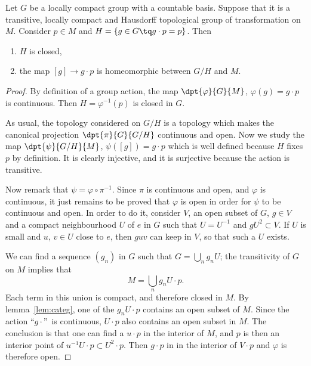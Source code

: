 \begin{theorem} \label{tho:homeo_action}
Let $G$ be a locally compact group with a countable basis. Suppose that it is a transitive, locally compact and Hausdorff topological group of transformation on $M$. Consider $p\in M$ and $H=\{g\in G\tq g\cdot p=p\}$. Then
\begin{enumerate}
\item $H$ is closed,
\item the map $[g]\to g\cdot p$ is homeomorphic between  $G/H$ and $M$.
\end{enumerate}
\end{theorem}

\begin{proof}
By definition of a group action, the map $\dpt{\varphi}{G}{M}$, $\varphi(g)=g\cdot p$ is continuous. Then $H=\varphi^{-1}(p)$ is closed in $G$.

As usual, the topology considered on $G/H$ is a topology which makes the canonical projection $\dpt{\pi}{G}{G/H}$ continuous and open. Now we study the map $\dpt{\psi}{G/H}{M}$, $\psi([g])=g\cdot p$ which is well defined because $H$ fixes $p$ by definition. It is clearly injective, and it is surjective because the action is transitive.

Now remark that $\psi=\varphi\circ\pi^{-1}$. Since $\pi$ is continuous and open, and $\varphi$ is continuous, it just remains to be proved that $\varphi$ is open in order for $\psi$ to be continuous and open. In order to do it, consider $V$, an open subset of $G$, $g\in V$ and a compact neighbourhood $U$ of $e$ in $G$ such that $U=U^{-1}$ and $gU^2\subset V$. If $U$ is small and $u$, $v\in U$ close to $e$, then $guv$ can keep in $V$, so that such a $U$ exists.

We can find a sequence $(g_n)$ in $G$ such that $G=\bigcup_ng_nU$; the transitivity of $G$ on $M$ implies that
\[
  M=\bigcup_ng_nU\cdot p.
\]
Each term in this union is compact, and therefore closed in $M$. By lemma~\ref{lem:categ}, one of the $g_nU\cdot p$ contains an open subset of $M$. Since the action ``$g\cdot$''\ is continuous, $U\cdot p$ also contains an open subset in $M$. The conclusion is that one can find a $u\cdot p$ in the interior of $M$, and $p$ is then an interior point of $u^{-1} U\cdot p\subset U^2\cdot p$. Then $g\cdot p$ in in the interior of $V\cdot p$ and $\varphi$ is therefore open.
\end{proof}

